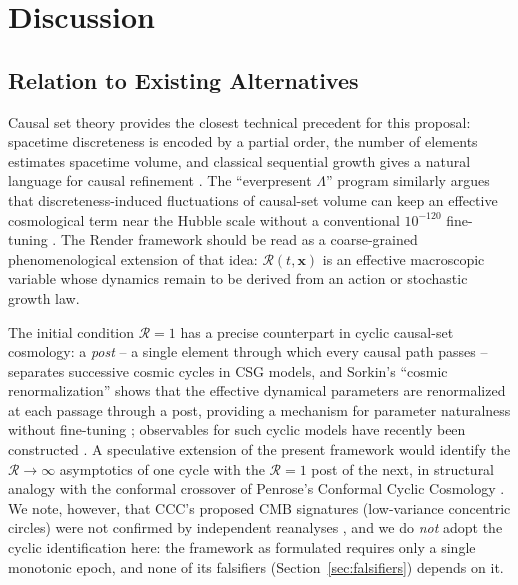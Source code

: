 \documentclass[12pt]{article}
\begin{document}
\section{Discussion}
\label{sec:discussion}

\subsection{Relation to Existing Alternatives}
Causal set theory provides the closest technical precedent for this proposal: spacetime discreteness is encoded by a partial order, the number of elements estimates spacetime volume, and classical sequential growth gives a natural language for causal refinement \citep{bombelli1987,rideout2000,dowker2013}. The ``everpresent $\Lambda$'' program similarly argues that discreteness-induced fluctuations of causal-set volume can keep an effective cosmological term near the Hubble scale without a conventional $10^{-120}$ fine-tuning \citep{sorkin2005,ahmed2004}. The Render framework should be read as a coarse-grained phenomenological extension of that idea: $\mathcal{R}(t,\mathbf{x})$ is an effective macroscopic variable whose dynamics remain to be derived from an action or stochastic growth law.

The initial condition $\mathcal{R}=1$ has a precise counterpart in cyclic causal-set cosmology: a \emph{post} -- a single element through which every causal path passes -- separates successive cosmic cycles in CSG models, and Sorkin's ``cosmic renormalization'' shows that the effective dynamical parameters are renormalized at each passage through a post, providing a mechanism for parameter naturalness without fine-tuning \citep{sorkin2000,dowkerzalel2017}; observables for such cyclic models have recently been constructed \citep{dowkerzalel2023}. A speculative extension of the present framework would identify the $\mathcal{R}\to\infty$ asymptotics of one cycle with the $\mathcal{R}=1$ post of the next, in structural analogy with the conformal crossover of Penrose's Conformal Cyclic Cosmology \citep{gurzadyanpenrose2010}. We note, however, that CCC's proposed CMB signatures (low-variance concentric circles) were not confirmed by independent reanalyses \citep{moss2011}, and we do \emph{not} adopt the cyclic identification here: the framework as formulated requires only a single monotonic epoch, and none of its falsifiers (Section~\ref{sec:falsifiers}) depends on it.
\end{document}
